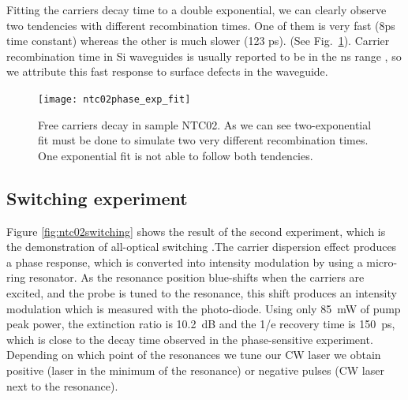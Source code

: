 Fitting the carriers decay time to a double exponential, we can clearly observe two tendencies with different recombination times. One of them is very fast (8ps time constant) whereas the other is much slower (123 ps). (See Fig.~\ref{fig:zoomTimeResNtc02Switching}). Carrier recombination time in Si waveguides is usually reported to be in the ns range \cite{Almeida2004b,Xu2007}, so we attribute this fast response to surface defects in the waveguide.

\begin{figure}[htb]
    \centering
    \texttt{[image: ntc02phase\_exp\_fit]}
    \caption{Free carriers decay in sample NTC02. As we can see two-exponential fit must be done to simulate two very different recombination times. One exponential fit is not able to follow both tendencies.}
    \label{fig:zoomTimeResNtc02Switching}
\end{figure}


\subsection{Switching experiment}
Figure \ref{fig:ntc02switching} shows the result of the second experiment, which is the demonstration of all-optical switching \cite{Oton}.The carrier dispersion effect produces a phase response, which is converted into intensity modulation by using a micro-ring resonator. As the resonance position blue-shifts when the carriers are excited, and the probe is tuned to the resonance, this shift produces an intensity modulation which is measured with the photo-diode. Using only 85~mW of pump peak power, the extinction ratio is 10.2~dB and the 1/e recovery time is 150~ps, which is close to the decay time observed in the phase-sensitive experiment. Depending on which point of the resonances we tune our CW laser we obtain positive (laser in the minimum of the resonance) or negative pulses (CW laser next to the resonance).  


